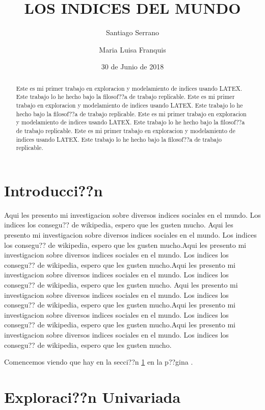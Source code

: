 \documentclass{article}
\title{LOS INDICES DEL MUNDO}
\author[1]{\normalsize Santiago Serrano}
\author[2]{\normalsize Maria Luisa Franquis}
\affil[1,2]{\small  Escuela de Ingenier??a,Universidad de los Andes\\
\texttt{{delcurso,deallado}@uniandes.edu.col}}
\affil[1]{\small Instituto de altas investigaciones financieras\\
Banco del Parque\\
\texttt{delcurso@bp.com.col}}
\date{30 de Junio de 2018}
\begin{document}


\maketitle


\begin{abstract}
Este es mi primer trabajo en exploracion y modelamiento de indices usando LATEX. Este trabajo lo he hecho bajo la filosof??a de trabajo replicable. Este es mi primer trabajo en exploracion y modelamiento de indices usando LATEX. Este trabajo lo he hecho bajo la filosof??a de trabajo replicable. Este es mi primer trabajo en exploracion y modelamiento de indices usando LATEX. Este trabajo lo he hecho bajo la filosof??a de trabajo replicable. Este es mi primer trabajo en exploracion y modelamiento de indices usando LATEX. Este trabajo lo he hecho bajo la filosof??a de trabajo replicable.
\end{abstract}

\section*{Introducci??n}

Aqui les presento mi investigacion sobre diversos indices sociales en el mundo. Los indices los consegu?? de wikipedia, espero que les gusten mucho. Aqui les presento mi investigacion sobre diversos indices sociales en el mundo. Los indices los consegu?? de wikipedia, espero que les gusten mucho.Aqui les presento mi investigacion sobre diversos indices sociales en el mundo. Los indices los consegu?? de wikipedia, espero que les gusten mucho.Aqui les presento mi investigacion sobre diversos indices sociales en el mundo. Los indices los consegu?? de wikipedia, espero que les gusten mucho.
Aqui les presento mi investigacion sobre diversos indices sociales en el mundo. Los indices los consegu?? de wikipedia, espero que les gusten mucho.Aqui les presento mi investigacion sobre diversos indices sociales en el mundo. Los indices los consegu?? de wikipedia, espero que les gusten mucho.Aqui les presento mi investigacion sobre diversos indices sociales en el mundo. Los indices los consegu?? de wikipedia, espero que les gusten mucho.

Comencemos viendo que hay en la secci??n \ref{univariada} en la p??gina \pageref{univariada}.

\clearpage



\section{Exploraci??n Univariada}\label{univariada}
\end{document}
